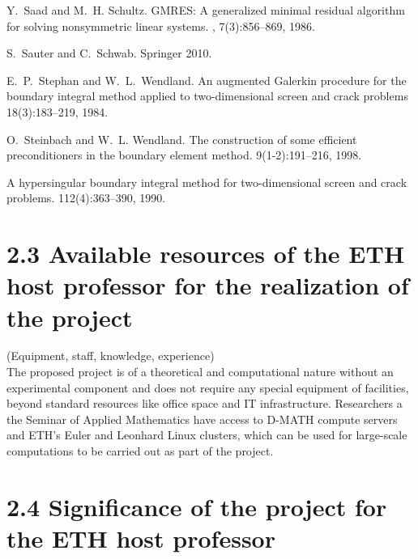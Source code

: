 \documentclass[]{article}
\begin{document}
\begin{small}
\begin{thebibliography}{0}
		
		Y.~Saad and M.~H. Schultz.
		\newblock GMRES: A generalized minimal residual algorithm for solving
		nonsymmetric linear systems.
		,
		7(3):856--869, 1986.
		
		S.~Sauter and C.~Schwab.
		\newblock Springer 2010.
		
		E.~P.~Stephan and W.~L.~Wendland.
		\newblock An augmented Galerkin procedure for the boundary integral method applied to two-dimensional screen and crack problems
		 18(3):183--219, 1984.
		
		
		O.~Steinbach and W.~L. Wendland.
		\newblock The construction of some efficient preconditioners in the boundary
		element method.
		 9(1-2):191--216, 1998.
		
		\newblock A hypersingular boundary integral method for two-dimensional screen and crack problems.
		 112(4):363--390, 1990.
		

		
		
	\end{thebibliography}
\end{small}

\section*{2.3 Available resources of the ETH host professor for the realization of the project}
(Equipment, staff, knowledge, experience)\\

The proposed project is of a theoretical and computational nature without an experimental component and does not require any special equipment of facilities, beyond standard resources like office space and IT infrastructure. Researchers a the Seminar of Applied Mathematics have access to D-MATH compute servers and ETH's Euler and Leonhard Linux clusters, which can be used for large-scale computations to be carried out as part of the project.

\section*{2.4 Significance of the project for the ETH host professor} 
\end{document}
